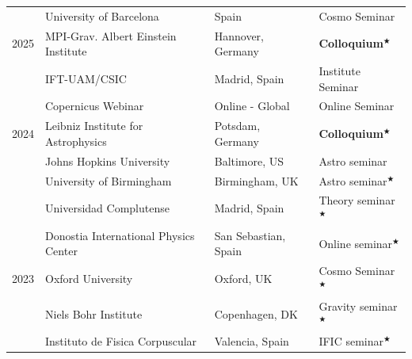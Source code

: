 \documentclass[11pt,a4paper]{article}
\begin{document}
\begin{longtable}{l p{} p{3.5cm} p{3cm}}
 & University of Barcelona &  Spain & Cosmo Seminar \\
2025
& MPI-Grav. Albert Einstein Institute & Hannover, Germany & \textbf{Colloquium}$^\bigstar$ \\
& IFT-UAM/CSIC & Madrid, Spain  & Institute Seminar \\ %
& Copernicus Webinar & Online - Global & {Online Seminar}  \\
2024
& Leibniz Institute for Astrophysics & Potsdam, Germany & \textbf{Colloquium}$^\bigstar$  \\
& Johns Hopkins University & Baltimore, US & Astro seminar \\
& University of Birmingham & Birmingham, UK & Astro seminar$^\bigstar$ \\
& Universidad Complutense & Madrid, Spain & Theory seminar$^\bigstar$ \\
 & Donostia International Physics Center & San Sebastian, Spain & Online seminar$^\bigstar$ \\
2023  & Oxford University & Oxford, UK & Cosmo Seminar$^\bigstar$ \\
& Niels Bohr Institute & Copenhagen, DK & Gravity seminar$^\bigstar$ \\
& Instituto de Fisica Corpuscular & Valencia, Spain & IFIC seminar$^\bigstar$ 
\\

\end{longtable}
\end{document}
